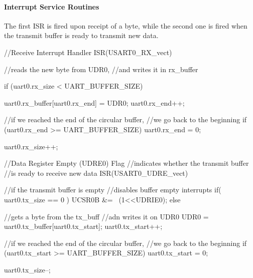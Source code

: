 \paragraph{Interrupt Service Routines}
The first ISR is fired upon receipt of a byte, while the second one is fired when the transmit buffer is ready to transmit new data.
\begin{ccode}
	//Receive Interrupt Handler
	ISR(USART0_RX_vect) {
		//reads the new byte from UDR0,
			//and writes it in rx_buffer
	
		if (uart0.rx_size < UART_BUFFER_SIZE) {
			uart0.rx_buffer[uart0.rx_end] = UDR0;
			uart0.rx_end++;
		
		  //if we reached the end of the circular buffer,
		  	//we go back to the beginning
			if (uart0.rx_end >= UART_BUFFER_SIZE)
				uart0.rx_end = 0;
	
			uart0.rx_size++;
		}
	}

	//Data Register Empty (UDRE0) Flag
		//indicates whether the transmit buffer
		//is ready to receive new data
	ISR(USART0_UDRE_vect) {	
		//if the transmit buffer is empty
			//disables buffer empty interrupts
		if( uart0.tx_size == 0 )
			UCSR0B &= ~(1<<UDRIE0);
		else {
			//gets a byte from the tx_buff
				//adn writes it on UDR0
			UDR0 = uart0.tx_buffer[uart0.tx_start];
			uart0.tx_start++;
	
			//if we reached the end of the circular buffer,
				//we go back to the beginning
			if (uart0.tx_start >= UART_BUFFER_SIZE)
				uart0.tx_start = 0;
	
			uart0.tx_size--;
		}
	}
\end{ccode}
